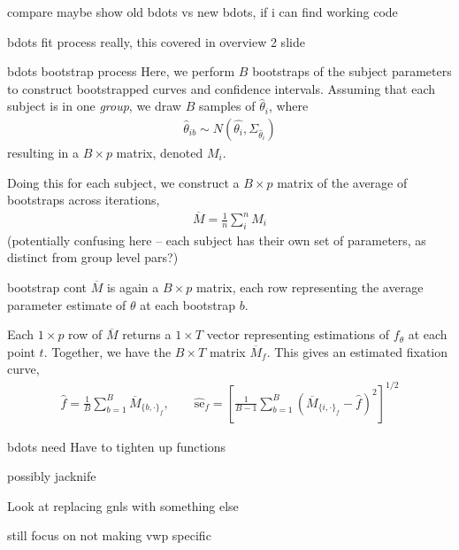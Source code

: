 \documentclass{beamer}
\begin{document}
\begin{frame}{compare}
maybe show old bdots vs new bdots, if i can find working code
\end{frame}

\begin{frame}{bdots fit process}
really, this covered in overview 2 slide
\end{frame}

\begin{frame}{bdots bootstrap process}
Here, we perform $B$ bootstraps of the subject parameters to construct bootstrapped curves and confidence intervals. Assuming that each subject is in one \textit{group}, we draw $B$ samples of $\hat{\theta}_i$, where 
\begin{align*}
\hat{\theta}_{ib} \sim N \left(\hat{\theta_i},  \Sigma_{\hat{\theta}_i} \right)
\end{align*}
resulting in a $B\times p$ matrix, denoted $M_i$. \newline 

Doing this for each subject, we construct a $B\times p$ matrix of the average of bootstraps across iterations, 
\begin{align*}
\overline{M} = \frac1n \sum_{i}^n M_i
\end{align*}
(potentially confusing here -- each subject has their own set of parameters, as distinct from group level pars?)
\end{frame}

\begin{frame}{bootstrap cont}
$\overline{M}$ is again a $B \times p$ matrix, each row  representing the average parameter estimate of $\theta$ at each bootstrap $b$. \newline 

Each $1\times p$ row of $\overline{M}$ returns a $1 \times T$ vector representing estimations of $f_{\theta}$ at each point $t$. Together, we have the $B \times T$ matrix $\overline{M}_f$. This gives an estimated fixation curve, 
\begin{align*}
\hat{f} = \frac1B \sum_{b=1}^B \overline{M}_{\{b, \cdot\}_f}, \qquad \widehat{\text{se}}_{f} = \left[ \frac{1}{B-1} \sum_{b=1}^B \left( \overline{M}_{\{i, \cdot\}_{f}} - \hat{f} \right)^2 \right]^{1/2} 
\end{align*}
\end{frame}

\begin{frame}{bdots need}
Have to tighten up functions \newline 

possibly jacknife \newline 

Look at replacing gnls with something else \newline 

still focus on not making vwp specific
\end{frame}
\end{document}
